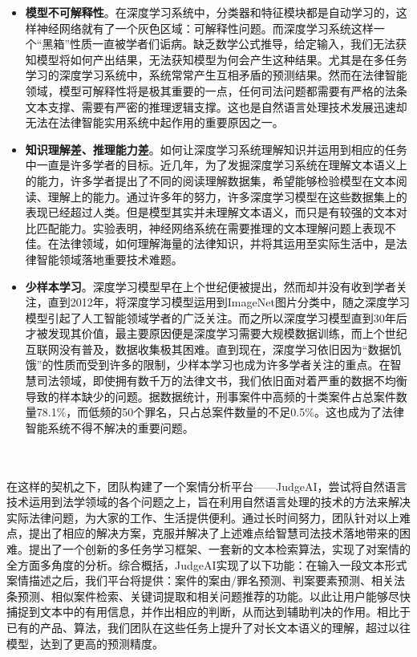 \begin{itemize}
	\item \textbf{模型不可解释性}。在深度学习系统中，分类器和特征模块都是自动学习的，这样神经网络就有了一个灰色区域：可解释性问题。而深度学习系统这样一个“黑箱”性质一直被学者们诟病。缺乏数学公式推导，给定输入，我们无法获知模型将如何产出结果，无法获知模型为何会产生这种结果。尤其是在多任务学习的深度学习系统中，系统常常产生互相矛盾的预测结果。然而在法律智能领域，模型可解释性将是极其重要的一点，任何司法问题都需要有严格的法条文本支撑、需要有严密的推理逻辑支撑。这也是自然语言处理技术发展迅速却无法在法律智能实用系统中起作用的重要原因之一。
	
	\item \textbf{知识理解差、推理能力差}。如何让深度学习系统理解知识并运用到相应的任务中一直是许多学者的目标。近几年，为了发掘深度学习系统在理解文本语义上的能力，许多学者提出了不同的阅读理解数据集\cite{nguyen2016ms,rajpurkar2016squad,trischler2016newsqa}，希望能够检验模型在文本阅读、理解上的能力。通过许多年的努力，许多深度学习模型在这些数据集上的表现已经超过人类。但是模型其实并未理解文本语义，而只是有较强的文本对比匹配能力\cite{clark2018think}。\citet{kwiatkowski2019natural}实验表明，神经网络系统在需要推理的文本理解问题上表现不佳。在法律领域，如何理解海量的法律知识，并将其运用至实际生活中，是法律智能领域落地重要技术难题。
	
	\item \textbf{少样本学习}。深度学习模型早在上个世纪便被提出，然而却并没有收到学者关注，直到2012年，\citet{krizhevsky2012imagenet}将深度学习模型运用到ImageNet图片分类中，随之深度学习模型引起了人工智能领域学者的广泛关注。而之所以深度学习模型直到30年后才被发现其价值，最主要原因便是深度学习需要大规模数据训练，而上个世纪互联网没有普及，数据收集极其困难。直到现在，深度学习依旧因为“数据饥饿”的性质而受到许多的限制，少样本学习也成为许多学者关注的重点。在智慧司法领域，即使拥有数千万的法律文书，我们依旧面对着严重的数据不均衡导致的样本缺少的问题。据数据统计，刑事案件中高频的十类案件占总案件数量78.1\%，而低频的50个罪名，只占总案件数量的不足0.5\%。这也成为了法律智能系统不得不解决的重要问题。
	

\end{itemize}


~\\
\\

在这样的契机之下，团队构建了一个案情分析平台——JudgeAI，尝试将自然语言技术运用到法学领域的各个问题之上，旨在利用自然语言处理的技术的方法来解决实际法律问题，为大家的工作、生活提供便利。通过长时间努力，团队针对以上难点，提出了相应的解决方案，克服并解决了上述难点给智慧司法技术落地带来的困难。提出了一个创新的多任务学习框架、一套新的文本检索算法，实现了对案情的全方面多角度的分析。综合概括，JudgeAI实现了以下功能：在输入一段文本形式案情描述之后，我们平台将提供：案件的案由/罪名预测、判案要素预测、相关法条预测、相似案件检索、关键词提取和相关问题推荐的功能。以此让用户能够尽快捕捉到文本中的有用信息，并作出相应的判断，从而达到辅助判决的作用。相比于已有的产品、算法，我们团队在这些任务上提升了对长文本语义的理解，超过以往模型，达到了更高的预测精度。
